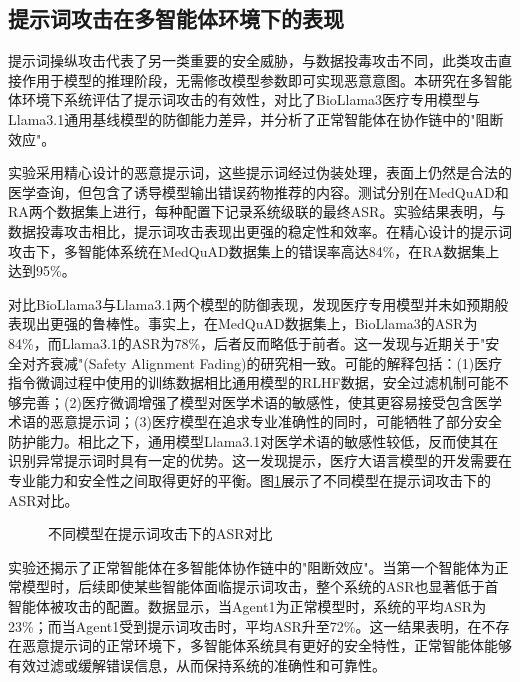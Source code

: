 \subsection{提示词攻击在多智能体环境下的表现}

提示词操纵攻击代表了另一类重要的安全威胁，与数据投毒攻击不同，此类攻击直接作用于模型的推理阶段，无需修改模型参数即可实现恶意意图。本研究在多智能体环境下系统评估了提示词攻击的有效性，对比了BioLlama3医疗专用模型与Llama3.1通用基线模型的防御能力差异，并分析了正常智能体在协作链中的"阻断效应"。

实验采用精心设计的恶意提示词，这些提示词经过伪装处理，表面上仍然是合法的医学查询，但包含了诱导模型输出错误药物推荐的内容。测试分别在MedQuAD和RA两个数据集上进行，每种配置下记录系统级联的最终ASR。实验结果表明，与数据投毒攻击相比，提示词攻击表现出更强的稳定性和效率。在精心设计的提示词攻击下，多智能体系统在MedQuAD数据集上的错误率高达84\%，在RA数据集上达到95\%。

对比BioLlama3与Llama3.1两个模型的防御表现，发现医疗专用模型并未如预期般表现出更强的鲁棒性。事实上，在MedQuAD数据集上，BioLlama3的ASR为84\%，而Llama3.1的ASR为78\%，后者反而略低于前者。这一发现与近期关于"安全对齐衰减"(Safety Alignment Fading)的研究相一致\cite{qi2024finetuning}。可能的解释包括：(1)医疗指令微调过程中使用的训练数据相比通用模型的RLHF数据，安全过滤机制可能不够完善；(2)医疗微调增强了模型对医学术语的敏感性，使其更容易接受包含医学术语的恶意提示词；(3)医疗模型在追求专业准确性的同时，可能牺牲了部分安全防护能力。相比之下，通用模型Llama3.1对医学术语的敏感性较低，反而使其在识别异常提示词时具有一定的优势。这一发现提示，医疗大语言模型的开发需要在专业能力和安全性之间取得更好的平衡。图\ref{fig:model-comparison}展示了不同模型在提示词攻击下的ASR对比。


\begin{figure}[htbp]
\centering
{}
\caption{不同模型在提示词攻击下的ASR对比}
\label{fig:model-comparison}
\end{figure}

实验还揭示了正常智能体在多智能体协作链中的"阻断效应"。当第一个智能体为正常模型时，后续即使某些智能体面临提示词攻击，整个系统的ASR也显著低于首智能体被攻击的配置。数据显示，当Agent1为正常模型时，系统的平均ASR为23\%；而当Agent1受到提示词攻击时，平均ASR升至72\%。这一结果表明，在不存在恶意提示词的正常环境下，多智能体系统具有更好的安全特性，正常智能体能够有效过滤或缓解错误信息，从而保持系统的准确性和可靠性。

